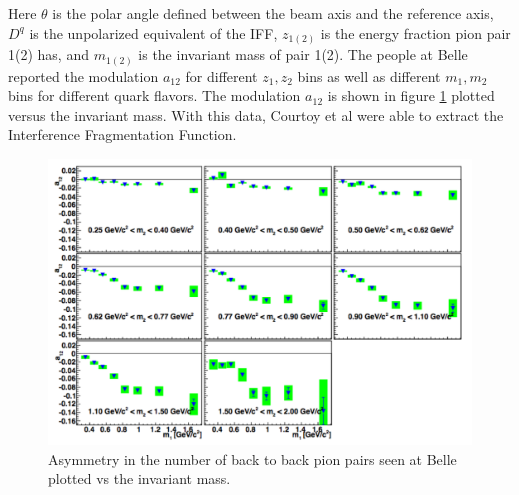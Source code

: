 \documentclass[abstract = on,listof=totoc, bibliography=totoc]{scrreprt}
\begin{document}
Here $\theta$ is the polar angle defined between the beam axis and the reference axis, $D^q$ is the unpolarized equivalent of the IFF, $z_{1(2)}$ is the energy fraction pion pair 1(2) has, and $m_{1(2)}$ is the invariant mass of pair 1(2). The people at Belle reported the modulation $a_{12}$ for different $z_1,z_2$ bins as well as different $m_1,m_2$ bins for different quark flavors. The modulation $a_{12}$ is shown in figure \ref{fig:BelleMod} plotted versus the invariant mass. With this data, Courtoy et al were able to extract the Interference Fragmentation Function.\cite{extractIFF}

 \begin{figure}
\begin{center}
\includegraphics[width = 1\textwidth]{BelleAnnModulationM}
\caption[Asymmetry seen in $e^-e^+$ annihilation at Belle]{Asymmetry in the number of back to back pion pairs seen at Belle plotted vs the invariant mass.}
\label{fig:BelleMod}
\end{center}
\end{figure}
\end{document}
